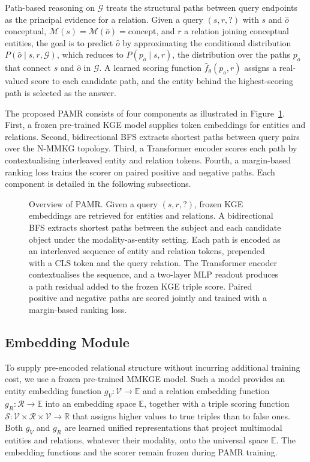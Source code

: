 \documentclass[runningheads]{llncs}
\begin{document}
Path-based reasoning on $\mathcal{G}$ treats the structural paths
between query endpoints as the principal evidence for a relation. Given
a query $(s, r, ?)$ with $s$ and $\hat{o}$ conceptual,
$\mathcal{M}(s) = \mathcal{M}(\hat{o}) = \text{concept}$, and $r$ a
relation joining conceptual entities, the goal is to predict $\hat{o}$ by
approximating the conditional distribution $P(\hat{o} \mid s, r,
\mathcal{G})$, which reduces to $P(p_o \mid s, r)$, the distribution
over the paths $p_o$ that connect $s$ and $\hat{o}$ in $\mathcal{G}$. A
learned scoring function $\hat{f}_\theta(p_o, r)$ assigns a real-valued
score to each candidate path, and the entity behind the highest-scoring
path is selected as the answer.

The proposed PAMR consists of four components as illustrated in
Figure~\ref{fig:overview}. First, a frozen pre-trained KGE model supplies
token embeddings for entities and relations. Second, bidirectional BFS
extracts shortest paths between query pairs over the N-MMKG topology.
Third, a Transformer encoder scores each path by contextualising
interleaved entity and relation tokens. Fourth, a margin-based ranking
loss trains the scorer on paired positive and negative paths. Each
component is detailed in the following subsections.

\begin{figure}[t]
  \centering
  
  \caption{Overview of PAMR. Given a query $(s, r, ?)$, frozen KGE embeddings are retrieved for entities and relations. A bidirectional BFS extracts shortest paths between the subject and each candidate object under the modality-as-entity setting. Each path is encoded as an interleaved sequence of entity and relation tokens, prepended with a CLS token and the query relation. The Transformer encoder contextualises the sequence, and a two-layer MLP readout produces a path residual added to the frozen KGE triple score. Paired positive and negative paths are scored jointly and trained with a margin-based ranking loss.}
  \label{fig:overview}
\end{figure}

\subsection{Embedding Module}
\label{sec:embedding-module}

To supply pre-encoded relational structure without incurring additional
training cost, we use a frozen pre-trained MMKGE model. Such a model
provides an entity embedding function $g_V: \mathcal{V} \rightarrow
\mathbb{E}$ and a relation embedding function $g_R: \mathcal{R}
\rightarrow \mathbb{E}$ into an embedding space $\mathbb{E}$, together
with a triple scoring function $\mathcal{S}: \mathcal{V} \times
\mathcal{R} \times \mathcal{V} \rightarrow \mathbb{R}$ that assigns
higher values to true triples than to false ones. Both $g_V$ and $g_R$
are learned unified representations that project multimodal entities
and relations, whatever their modality, onto the universal space
$\mathbb{E}$. The embedding functions and the scorer remain frozen
during PAMR training.
\end{document}
